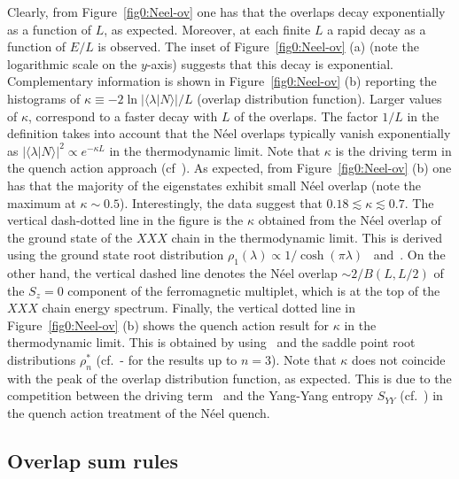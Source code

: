 \documentclass[11pt]{iopart}
\begin{document}
Clearly, from Figure~\ref{fig0:Neel-ov} one has that the overlaps decay exponentially 
as a function of $L$, as expected. Moreover, at each finite $L$ a rapid decay as a 
function of $E/L$ is observed. The inset of Figure~\ref{fig0:Neel-ov} (a) (note the 
logarithmic scale on the $y$-axis) suggests that this decay is exponential. Complementary 
information is shown in Figure~\ref{fig0:Neel-ov} (b) reporting the histograms of $\kappa
\equiv-2\ln|\langle\lambda|N\rangle|/L$ (overlap distribution function). Larger values 
of $\kappa$, correspond to a faster decay with $L$ of the overlaps. The factor $1/L$ 
in the definition takes into account that the N\'eel overlaps typically vanish 
exponentially as $|\langle\lambda|N\rangle|^2\propto e^{-\kappa L}$ in the thermodynamic 
limit. Note that $\kappa$ is the driving term in the quench action approach (cf~). 
As expected, from Figure~\ref{fig0:Neel-ov} (b) one has that the majority of the 
eigenstates exhibit small N\'eel overlap (note the maximum at $\kappa\sim 0.5$). 
Interestingly, the data suggest that $0.18\lesssim\kappa\lesssim0.7$. The vertical 
dash-dotted line in the figure is the $\kappa$ obtained from the N\'eel overlap of 
the ground state of the $XXX$ chain in the thermodynamic limit. This is derived using 
the ground state root distribution $\rho_1(\lambda)\propto1/\cosh(\pi\lambda)$~\cite{taka-book} 
and~. On the other hand, the vertical dashed line denotes the N\'eel 
overlap $\sim 2/B(L,L/2)$ of the $S_z=0$ component of the ferromagnetic multiplet, which 
is at the top of the $XXX$ chain energy spectrum. Finally, the vertical dotted line in 
Figure~\ref{fig0:Neel-ov} (b) shows the quench action result for $\kappa$ in the thermodynamic 
limit. This is obtained by using~ and the saddle point root distributions 
$\rho_n^*$ (cf.~- for the results up to $n=3$). Note that $\kappa$ 
does not coincide with the peak of the overlap distribution function, as expected. This is  
due to the competition between the driving term~ and the Yang-Yang entropy 
$S_{YY}$ (cf.~) in the quench action treatment of the N\'eel quench. 

\subsection{Overlap sum rules}
\label{sec:5.2}
\end{document}
